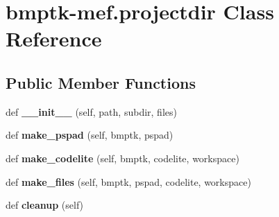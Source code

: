 \hypertarget{classbmptk-mef_1_1projectdir}{}\section{bmptk-\/mef.projectdir Class Reference}
\label{classbmptk-mef_1_1projectdir}
\subsection*{Public Member Functions}
\begin{DoxyCompactItemize}
\item 
def {\bfseries \+\_\+\+\_\+init\+\_\+\+\_\+} (self, path, subdir, files)\hypertarget{classbmptk-mef_1_1projectdir_a64e46a65f477fdb91b35aef0357e2885}{}\label{classbmptk-mef_1_1projectdir_a64e46a65f477fdb91b35aef0357e2885}

\item 
def {\bfseries make\+\_\+pspad} (self, bmptk, pspad)\hypertarget{classbmptk-mef_1_1projectdir_a97ffe6bba59b711b7236d942aa4505b2}{}\label{classbmptk-mef_1_1projectdir_a97ffe6bba59b711b7236d942aa4505b2}

\item 
def {\bfseries make\+\_\+codelite} (self, bmptk, codelite, workspace)\hypertarget{classbmptk-mef_1_1projectdir_af52ba67a7dc741845b249b569e6388e9}{}\label{classbmptk-mef_1_1projectdir_af52ba67a7dc741845b249b569e6388e9}

\item 
def {\bfseries make\+\_\+files} (self, bmptk, pspad, codelite, workspace)\hypertarget{classbmptk-mef_1_1projectdir_a0d99d7237519866c01090fa5c2385adb}{}\label{classbmptk-mef_1_1projectdir_a0d99d7237519866c01090fa5c2385adb}

\item 
def {\bfseries cleanup} (self)\hypertarget{classbmptk-mef_1_1projectdir_ae289a43411d3740cf6378dd8323c34bd}{}\label{classbmptk-mef_1_1projectdir_ae289a43411d3740cf6378dd8323c34bd}

\end{DoxyCompactItemize}
